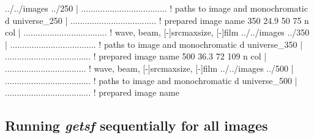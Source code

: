 \documentclass[a4paper,10pt]{article}
\begin{document}
\begin{verbnobox}[\mbox{}\small]
 ../../images ../250 | .................................... ! paths to image and monochromatic d
 universe_250        | .................................... ! prepared image name
 350 24.9 50 75 n col | ................................... ! wave, beam, [-]srcmaxsize, [-]film
 ../../images ../350 | .................................... ! paths to image and monochromatic d
 universe_350        | .................................... ! prepared image name
 500 36.3 72 109 n col | .................................. ! wave, beam, [-]srcmaxsize, [-]film
 ../../images ../500 | .................................... ! paths to image and monochromatic d
 universe_500        | .................................... ! prepared image name
\end{verbnobox}


\subsection{Running \textsl{getsf} sequentially for all images}
\label{sequence}
\end{document}
